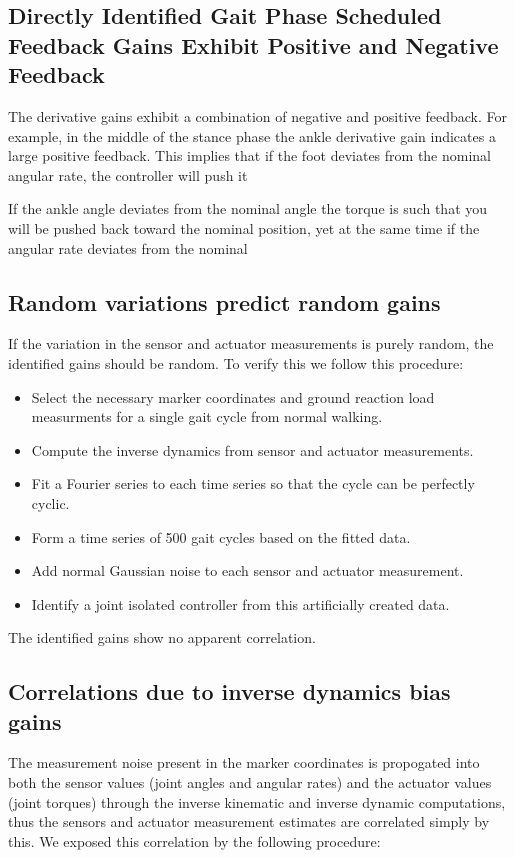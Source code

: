\documentclass{article}
\begin{document}

\subsection*{Directly Identified Gait Phase Scheduled Feedback Gains Exhibit
  Positive and Negative Feedback}
%
The derivative gains exhibit a combination of negative and positive feedback.
For example, in the middle of the stance phase the ankle derivative gain
indicates a large positive feedback. This implies that if the foot deviates
from the nominal angular rate, the controller will push it

If the ankle angle deviates from the nominal angle the torque is such that you
will be pushed back toward the nominal position, yet at the same time if the
angular rate deviates from the nominal


\subsection*{Random variations predict random gains}
%
If the variation in the sensor and actuator measurements is purely random, the
identified gains should be random. To verify this we follow this procedure:

\begin{itemize}
  \item Select the necessary marker coordinates and ground reaction load
    measurments for a single gait cycle from normal walking.
  \item Compute the inverse dynamics from sensor and actuator measurements.
  \item Fit a Fourier series to each time series so that the cycle can be
    perfectly cyclic.
  \item Form a time series of 500 gait cycles based on the fitted data.
  \item Add normal Gaussian noise to each sensor and actuator measurement.
  \item Identify a joint isolated controller from this artificially created
    data.
\end{itemize}

The identified gains show no apparent correlation. 

\subsection*{Correlations due to inverse dynamics bias gains}
%
The measurement noise present in the marker coordinates is propogated into both
the sensor values (joint angles and angular rates) and the actuator values
(joint torques) through the inverse kinematic and inverse dynamic computations,
thus the sensors and actuator measurement estimates are correlated simply by
this. We exposed this correlation by the following procedure:
\end{document}
